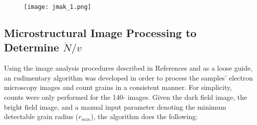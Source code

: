 	\begin{figure}[h]
		\centering
		\texttt{[image: jmak\_1.png]}
		\caption{}
		\label{fig:jmak_1}
	\end{figure}

\subsection{Microstructural Image Processing to Determine $\dot{N}/v$}

Using the image analysis procedures described in References \cite{chan:2020} and \cite{campbell:2018} as a loose guide, an rudimentary algorithm was developed in order to process the samples' electron microscopy images and count grains in a consistent manner.  For simplicity, counts were only performed for the 140- images.  Given the dark field image, the bright field image, and a manual input parameter denoting the minimum detectable grain radius ($r_{min}$), the algorithm does the following:

